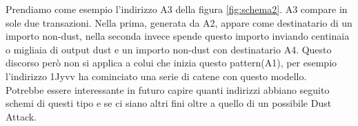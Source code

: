 \FloatBarrier
Prendiamo come esempio l'indirizzo A3 della figura \ref{fig:schema2}. A3 compare in sole due transazioni. Nella prima, generata da A2, appare come destinatario di un importo non-dust, nella seconda invece spende questo importo inviando centinaia o migliaia di output dust e un importo non-dust con destinatario A4. Questo discorso però non si applica a colui che inizia questo pattern(A1), per esempio l'indirizzo 1Jyvv ha cominciato una serie di catene con questo modello.\\Potrebbe essere interessante in futuro capire quanti indirizzi abbiano seguito schemi di questi tipo e se ci siano altri fini oltre a quello di un possibile Dust Attack.